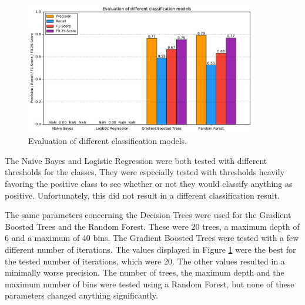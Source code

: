 \begin{figure}[H]
	\centering
	\includegraphics[width=0.9\textwidth]{img/classifier_eval}
	\caption{Evaluation of different classification models.}
	\label{classifier_eval}
\end{figure}
The Naive Bayes and Logistic Regression were both tested with different thresholds for the classes. They were especially tested with thresholds heavily favoring the positive class to see whether or not they would classify anything as positive. Unfortunately, this did not result in a different classification result.\par
The same parameters concerning the Decision Trees were used for the Gradient Boosted Trees and the Random Forest. These were 20 trees, a maximum depth of 6 and a maximum of 40 bins. The Gradient Boosted Trees were tested with a few different number of iterations. The values displayed in Figure \ref{classifier_eval} were the best for the tested number of iterations, which were 20. The other values resulted in a minimally worse precision. The number of trees, the maximum depth and the maximum number of bins were tested using a Random Forest, but none of these parameters changed anything significantly.\par

